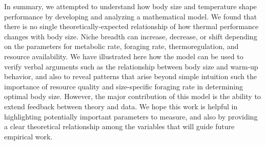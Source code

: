 In summary, we attempted to understand how body size and temperature shape performance by developing and analyzing a mathematical model.
We found that there is no single theoretically-expected relationship of how thermal performance changes with body size.
Niche breadth can increase, decrease, or shift depending on the parameters for metabolic rate, foraging rate, thermoregulation, and resource availability.
We have illustrated here how the model can be used to verify verbal arguments such as the relationship between body size and warm-up behavior, and also to reveal patterns that arise beyond simple intuition such the importance of resource quality and size-specific foraging rate in determining optimal body size.
However, the major contribution of this model is the ability to extend feedback between theory and data.
We hope this work is helpful in highlighting potentially important parameters to measure, and also by providing a clear theoretical relationship among the variables that will guide future empirical work.




%
%
%

